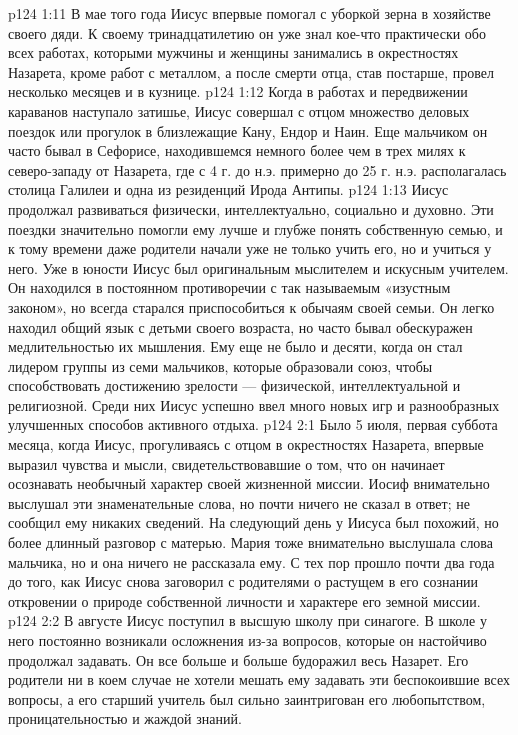 \vs p124 1:11 \pc В мае того года Иисус впервые помогал с уборкой зерна в хозяйстве своего дяди. К своему тринадцатилетию он уже знал кое\hyp{}что практически обо всех работах, которыми мужчины и женщины занимались в окрестностях Назарета, кроме работ с металлом, а после смерти отца, став постарше, провел несколько месяцев и в кузнице.
\vs p124 1:12 Когда в работах и передвижении караванов наступало затишье, Иисус совершал с отцом множество деловых поездок или прогулок в близлежащие Кану, Ендор и Наин. Еще мальчиком он часто бывал в Сефорисе, находившемся немного более чем в трех милях к северо\hyp{}западу от Назарета, где с 4 г. до н.э. примерно до 25 г. н.э. располагалась столица Галилеи и одна из резиденций Ирода Антипы.
\vs p124 1:13 Иисус продолжал развиваться физически, интеллектуально, социально и духовно. Эти поездки значительно помогли ему лучше и глубже понять собственную семью, и к тому времени даже родители начали уже не только учить его, но и учиться у него. Уже в юности Иисус был оригинальным мыслителем и искусным учителем. Он находился в постоянном противоречии с так называемым «изустным законом», но всегда старался приспособиться к обычаям своей семьи. Он легко находил общий язык с детьми своего возраста, но часто бывал обескуражен медлительностью их мышления. Ему еще не было и десяти, когда он стал лидером группы из семи мальчиков, которые образовали союз, чтобы способствовать достижению зрелости --- физической, интеллектуальной и религиозной. Среди них Иисус успешно ввел много новых игр и разнообразных улучшенных способов активного отдыха.
\vs p124 2:1 Было 5 июля, первая суббота месяца, когда Иисус, прогуливаясь с отцом в окрестностях Назарета, впервые выразил чувства и мысли, свидетельствовавшие о том, что он начинает осознавать необычный характер своей жизненной миссии. Иосиф внимательно выслушал эти знаменательные слова, но почти ничего не сказал в ответ; не сообщил ему никаких сведений. На следующий день у Иисуса был похожий, но более длинный разговор с матерью. Мария тоже внимательно выслушала слова мальчика, но и она ничего не рассказала ему. С тех пор прошло почти два года до того, как Иисус снова заговорил с родителями о растущем в его сознании откровении о природе собственной личности и характере его земной миссии.
\vs p124 2:2 \pc В августе Иисус поступил в высшую школу при синагоге. В школе у него постоянно возникали осложнения из\hyp{}за вопросов, которые он настойчиво продолжал задавать. Он все больше и больше будоражил весь Назарет. Его родители ни в коем случае не хотели мешать ему задавать эти беспокоившие всех вопросы, а его старший учитель был сильно заинтригован его любопытством, проницательностью и жаждой знаний.
